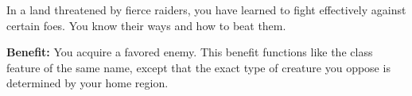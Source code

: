 
In a land threatened by fierce raiders, you have learned to fight effectively against certain foes. You know their ways and how to beat them.

\textbf{Benefit:} You acquire a favored enemy. This benefit functions like the  class feature of the same name, except that the exact type of creature you oppose is determined by your home region.